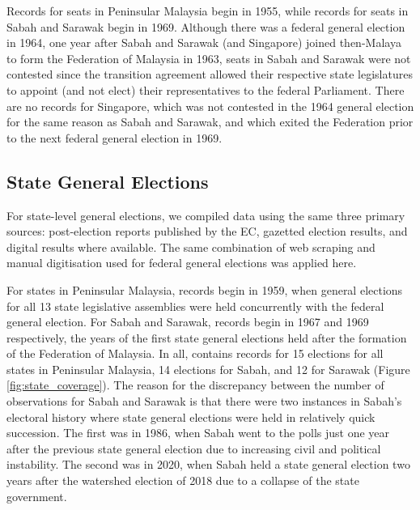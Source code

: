 \documentclass[11pt]{article}
\begin{document}
Records for seats in Peninsular Malaysia begin in 1955, while records for seats in Sabah and Sarawak begin in 1969. Although there was a federal general election in 1964, one year after Sabah and Sarawak (and Singapore) joined then-Malaya to form the Federation of Malaysia in 1963, seats in Sabah and Sarawak were not contested since the transition agreement allowed their respective state legislatures to appoint (and not elect) their representatives to the federal Parliament.\cite{means1991malaysia} There are no records for Singapore, which was not contested in the 1964 general election for the same reason as Sabah and Sarawak, and which exited the Federation prior to the next federal general election in 1969.

\subsection*{State General Elections}

For state-level general elections, we compiled data using the same three primary sources: post-election reports published by the EC, gazetted election results, and digital results where available. The same combination of web scraping and manual digitisation used for federal general elections was applied here.

For states in Peninsular Malaysia, records begin in 1959, when general elections for all 13 state legislative assemblies were held concurrently with the federal general election. For Sabah and Sarawak, records begin in 1967 and 1969 respectively, the years of the first state general elections held after the formation of the Federation of Malaysia. In all, \acronym contains records for 15 elections for all states in Peninsular Malaysia, 14 elections for Sabah, and 12 for Sarawak (Figure \ref{fig:state_coverage}). The reason for the discrepancy between the number of observations for Sabah and Sarawak is that there were two instances in Sabah's electoral history where state general elections were held in relatively quick succession. The first was in 1986, when Sabah went to the polls just one year after the previous state general election due to increasing civil and political instability\cite{yusoff2001sabah}. The second was in 2020, when Sabah held a state general election two years after the watershed election of 2018 due to a collapse of the state government\cite{lee2020collapse}.
\end{document}
